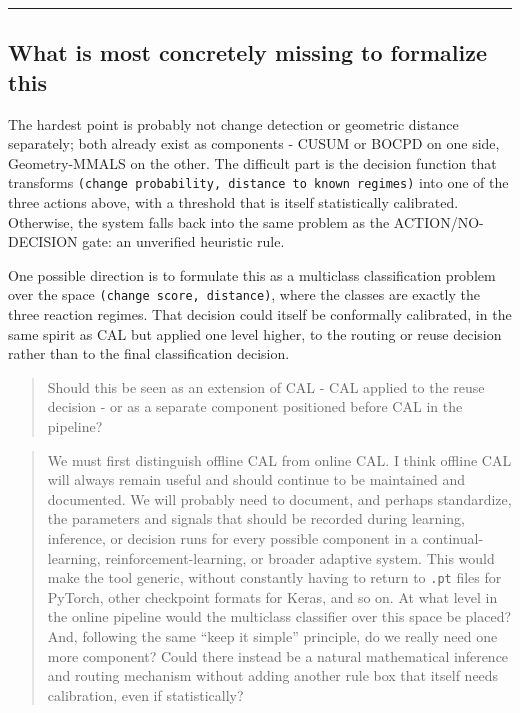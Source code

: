 \begin{center}\rule{0.5\linewidth}{0.5pt}\end{center}

\subsection{What is most concretely missing to formalize this}\label{what-is-most-concretely-missing-to-formalize-this}

The hardest point is probably not change detection or geometric distance separately; both already exist as components - CUSUM or BOCPD on one side, Geometry-MMALS on the other. The difficult part is the decision function that transforms \passthrough{\lstinline!(change probability, distance to known regimes)!} into one of the three actions above, with a threshold that is itself statistically calibrated. Otherwise, the system falls back into the same problem as the ACTION/NO-DECISION gate: an unverified heuristic rule.

One possible direction is to formulate this as a multiclass classification problem over the space \passthrough{\lstinline!(change score, distance)!}, where the classes are exactly the three reaction regimes. That decision could itself be conformally calibrated, in the same spirit as CAL but applied one level higher, to the routing or reuse decision rather than to the final classification decision.

\begin{quote}
Should this be seen as an extension of CAL - CAL applied to the reuse decision - or as a separate component positioned before CAL in the pipeline?
\end{quote}

\begin{quote}
We must first distinguish offline CAL from online CAL. I think offline CAL will always remain useful and should continue to be maintained and documented. We will probably need to document, and perhaps standardize, the parameters and signals that should be recorded during learning, inference, or decision runs for every possible component in a continual-learning, reinforcement-learning, or broader adaptive system. This would make the tool generic, without constantly having to return to \passthrough{\lstinline!.pt!} files for PyTorch, other checkpoint formats for Keras, and so on. At what level in the online pipeline would the multiclass classifier over this space be placed? And, following the same ``keep it simple'' principle, do we really need one more component? Could there instead be a natural mathematical inference and routing mechanism without adding another rule box that itself needs calibration, even if statistically?
\end{quote}


